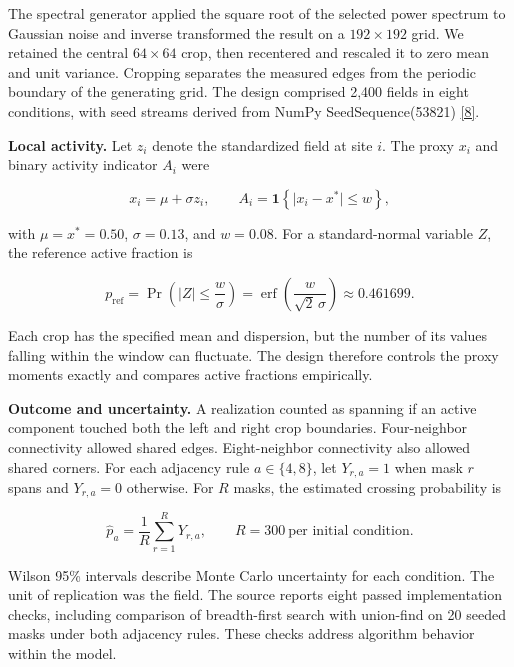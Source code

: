 \documentclass[11pt]{article}
\begin{document}
The spectral generator applied the square root of the selected power spectrum to Gaussian noise and inverse transformed the result on a $192\times 192$ grid. We retained the central $64\times 64$ crop, then recentered and rescaled it to zero mean and unit variance. Cropping separates the measured edges from the periodic boundary of the generating grid. The design comprised 2,400 fields in eight conditions, with seed streams derived from NumPy SeedSequence(53821) \href{https://github.com/tejasvswipe/superconductvity-nickelate-research/blob/267535fd908d3e235b5c46d0fefe744221cf16e7/spatial_covariance_sensitivity.py}{[8]}.

\textbf{Local activity.} Let $z_i$ denote the standardized field at site $i$. The proxy $x_i$ and binary activity indicator $A_i$ were

\[
x_i=\mu+\sigma z_i,\qquad A_i=\mathbf{1}\!\left\{\lvert x_i-x^\ast\rvert\leq w\right\},
\]

with $\mu=x^\ast=0.50$, $\sigma=0.13$, and $w=0.08$. For a standard-normal variable $Z$, the reference active fraction is

\[
p_{\mathrm{ref}}=\Pr\!\left(\lvert Z\rvert\leq\frac{w}{\sigma}\right)
=\operatorname{erf}\!\left(\frac{w}{\sqrt{2}\,\sigma}\right)\approx 0.461699.
\]

Each crop has the specified mean and dispersion, but the number of its values falling within the window can fluctuate. The design therefore controls the proxy moments exactly and compares active fractions empirically.

\textbf{Outcome and uncertainty.} A realization counted as spanning if an active component touched both the left and right crop boundaries. Four-neighbor connectivity allowed shared edges. Eight-neighbor connectivity also allowed shared corners. For each adjacency rule $a\in\{4,8\}$, let $Y_{r,a}=1$ when mask $r$ spans and $Y_{r,a}=0$ otherwise. For $R$ masks, the estimated crossing probability is

\[
\widehat p_a=\frac{1}{R}\sum_{r=1}^{R}Y_{r,a},\qquad R=300\ \text{per initial condition}.
\]

Wilson 95\% intervals describe Monte Carlo uncertainty for each condition. The unit of replication was the field. The source reports eight passed implementation checks, including comparison of breadth-first search with union-find on 20 seeded masks under both adjacency rules. These checks address algorithm behavior within the model.
\end{document}
